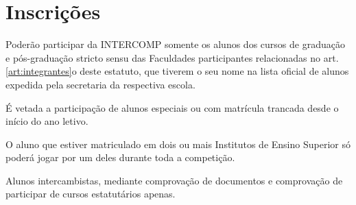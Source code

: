 
{\let\clearpage\relax \chapter{Inscrições}}

\begin{article}
	Poderão participar da INTERCOMP somente os alunos dos cursos de graduação e pós-graduação stricto sensu das Faculdades participantes relacionadas no art. \ref{art:integrantes}o deste estatuto, que tiverem o seu nome na lista oficial de alunos expedida pela secretaria da respectiva escola.

	\begin{xparagraph}
		É vetada a participação de alunos especiais ou com matrícula trancada desde o início do ano letivo.
	\end{xparagraph}

	\begin{xparagraph}
		O aluno que estiver matriculado em dois ou mais Institutos de Ensino Superior só poderá jogar por um deles durante toda a competição.
	\end{xparagraph}

	\begin{xparagraph}
		Alunos intercambistas, mediante comprovação de documentos e comprovação de participar de cursos estatutários apenas.
	\end{xparagraph}
\end{article}

